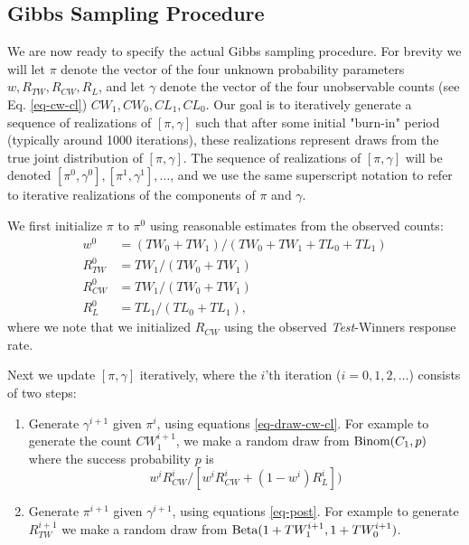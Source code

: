 \documentclass[11pt,a4paper]{article}
\theoremstyle{definition}
\theoremstyle{remark}
\theoremstyle{definition}
\theoremstyle{definition}
\theoremstyle{definition}
\theoremstyle{definition}
\theoremstyle{definition}
\theoremstyle{definition}
\begin{document}
\subsection{Gibbs Sampling Procedure}

We are now ready to specify the actual Gibbs sampling procedure. For brevity we will let $\pi$ denote the vector of the four unknown probability parameters $w,R_{TW}, R_{CW}, R_L$, and let $\gamma$ denote the vector of the four unobservable counts (see Eq. \ref{eq-cw-cl}) $CW_1, CW_0, CL_1, CL_0$. Our goal is to iteratively generate a sequence of realizations of $[\pi,\gamma]$ such that after some initial "burn-in" period (typically around 1000 iterations), these realizations represent draws from the true joint distribution of $[\pi, \gamma]$. The sequence of realizations of $[\pi,\gamma]$ will be denoted $[\pi^0, \gamma^0], [\pi^1, \gamma^1], \ldots$, and we use the same superscript notation to refer to iterative realizations of the components of $\pi$ and $\gamma$.

We first initialize $\pi$ to $\pi^0$ using reasonable estimates from the observed counts:
\begin{equation}
\begin{split}
w^0 &= (TW_0 + TW_1)/(TW_0 + TW_1 + TL_0 + TL_1) \\
R^0_{TW} &= TW_1/(TW_0 + TW_1) \\
R^0_{CW} &= TW_1/(TW_0 + TW_1) \\
R^0_L &= TL_1/(TL_0 + TL_1),
\end{split}
\end{equation}
where we note that we initialized $R_{CW}$ using the observed \textit{Test}-Winners response rate.

Next we update $[\pi,\gamma]$ iteratively, where the $i$'th iteration ($i = 0,1, 2, \ldots$) consists of two steps:
\begin{enumerate}
	\item Generate $\gamma^{i+1}$ given $\pi^i$, using equations \ref{eq-draw-cw-cl}. For example to generate the count $CW^{i+1}_1$, we make a random draw from $\text{Binom}(C_1, p)$ where the success probability $p$ is 
$$
w^i R^i_{CW}/[ w^i R^i_{CW} + (1-w^i)R^i_L])
$$

	\item Generate $\pi^{i+1}$ given $\gamma^{i+1}$, using equations \ref{eq-post}. For example to generate $R^{i+1}_{TW}$ we make a random draw from $\text{Beta}(1+TW^{i+1}_1, 1 + TW^{i+1}_0)$.

\end{enumerate}
\end{document}
